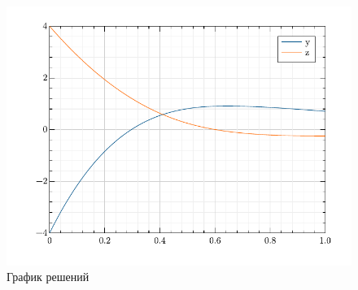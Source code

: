 \begin{figure}[H]
\captionsetup{justification=centering}
\setlength{\abovecaptionskip}{-10pt}
\renewcommand{\figurename}{Рисунок}
\caption{График решений}
\hspace{30pt}\includegraphics{../figures/result.pdf}
\end{figure}


